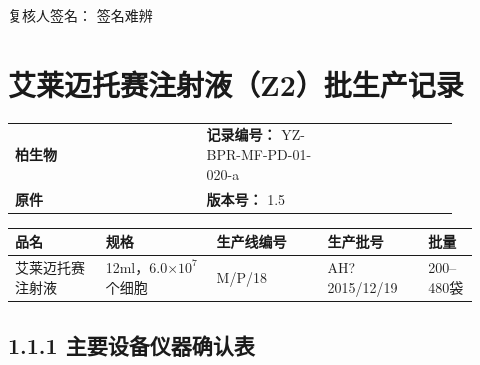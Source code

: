 \documentclass[UTF8,10pt,a4paper,fontset=fandol]{ctexart}
\newcommand{\fieldvalue}[1]{#1}
\newcommand{\handwritten}[1]{#1}
\begin{document}
\medskip

复核人签名：
\fieldvalue{\handwritten{签名难辨}}

\newpage

\section{艾莱迈托赛注射液（Z2）批生产记录}

\noindent
\begin{tabular}{p{0.16\linewidth}p{0.22\linewidth}p{0.28\linewidth}p{0.22\linewidth}}
\textbf{柏生物} & & \textbf{记录编号：}
\fieldvalue{YZ-BPR-MF-PD-01-020-a} &
\\
\textbf{原件} & & \textbf{版本号：}
\fieldvalue{1.5} &
\end{tabular}

\vspace{0.5em}

\noindent
\begin{tabular}{|p{0.18\linewidth}|p{0.22\linewidth}|p{0.22\linewidth}|p{0.20\linewidth}|p{0.10\linewidth}|}
\hline
品名 & 规格 & 生产线编号 & 生产批号 & 批量\\
\hline
\fieldvalue{艾莱迈托赛注射液} &
\fieldvalue{12ml，6.0$\times 10^{7}$个细胞} &
\fieldvalue{\handwritten{M/P/18}} &
\fieldvalue{\handwritten{AH?2015/12/19}} &
\fieldvalue{200--480袋}\\
\hline
\end{tabular}

\subsection{1.1.1 主要设备仪器确认表}
\end{document}
